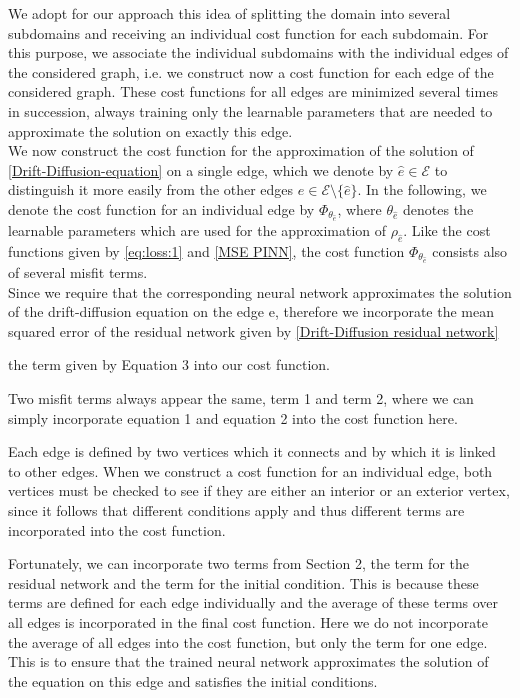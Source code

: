 We adopt for our approach this idea of splitting the domain into several subdomains and receiving an individual cost function for each subdomain. For this purpose, we associate the individual subdomains with the individual edges of the considered graph, i.e. we construct now a cost function for each edge of the considered graph. These cost functions for all edges are minimized several times in succession, always training only the learnable parameters that are needed to approximate the solution on exactly this edge.\\
We now construct the cost function for the approximation of the solution of \cref{Drift-Diffusion-equation} on a single edge, which we denote by $\hat{e} \in \mathcal{E}$ to distinguish it more easily from the other edges $e \in \mathcal{E} \setminus \{ \hat{e}\}$. In the following, we denote the cost function for an individual edge by $\Phi_{\theta_{\hat{e}}}$, where $\theta_{\hat{e}}$ denotes the learnable parameters which are used for the approximation of $\rho_{\hat{e}}$. Like the cost functions given by \cref{eq:loss:1} and \cref{MSE PINN}, the cost function $\Phi_{\theta_{\hat{e}}}$ consists also of several misfit terms. \\
Since we require that the corresponding neural network approximates the solution of the drift-diffusion equation on the edge e, therefore we incorporate the mean squared error of the residual network given by \cref{Drift-Diffusion residual network}

the term given by Equation 3 into our cost function.  

Two misfit terms always appear the same, term 1 and term 2, where we can simply incorporate equation 1 and equation 2 into the cost function here. 

Each edge is defined by two vertices which it connects and by which it is linked to other edges. When we construct a cost function for an individual edge, both vertices must be checked to see if they are either an interior or an exterior vertex, since it follows that different conditions apply and thus different terms are incorporated into the cost function. 

Fortunately, we can incorporate two terms from Section 2, the term for the residual network and the term for the initial condition. This is because these terms are defined for each edge individually and the average of these terms over all edges is incorporated in the final cost function. Here we do not incorporate the average of all edges into the cost function, but only the term for one edge. This is to ensure that the trained neural network approximates the solution of the equation on this edge and satisfies the initial conditions.  \\

